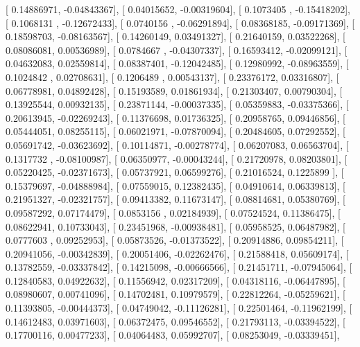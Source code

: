 \documentclass{article}
\begin{document}
       [ 0.14886971, -0.04843367],
       [ 0.04015652, -0.00319604],
       [ 0.1073405 , -0.15418202],
       [ 0.1068131 , -0.12672433],
       [ 0.0740156 , -0.06291894],
       [ 0.08368185, -0.09171369],
       [ 0.18598703, -0.08163567],
       [ 0.14260149,  0.03491327],
       [ 0.21640159,  0.03522268],
       [ 0.08086081,  0.00536989],
       [ 0.0784667 , -0.04307337],
       [ 0.16593412, -0.02099121],
       [ 0.04632083,  0.02559814],
       [ 0.08387401, -0.12042485],
       [ 0.12980992, -0.08963559],
       [ 0.1024842 ,  0.02708631],
       [ 0.1206489 ,  0.00543137],
       [ 0.23376172,  0.03316807],
       [ 0.06778981,  0.04892428],
       [ 0.15193589,  0.01861934],
       [ 0.21303407,  0.00790304],
       [ 0.13925544,  0.00932135],
       [ 0.23871144, -0.00037335],
       [ 0.05359883, -0.03375366],
       [ 0.20613945, -0.02269243],
       [ 0.11376698,  0.01736325],
       [ 0.20958765,  0.09446856],
       [ 0.05444051,  0.08255115],
       [ 0.06021971, -0.07870094],
       [ 0.20484605,  0.07292552],
       [ 0.05691742, -0.03623692],
       [ 0.10114871, -0.00278774],
       [ 0.06207083,  0.06563704],
       [ 0.1317732 , -0.08100987],
       [ 0.06350977, -0.00043244],
       [ 0.21720978,  0.08203801],
       [ 0.05220425, -0.02371673],
       [ 0.05737921,  0.06599276],
       [ 0.21016524,  0.1225899 ],
       [ 0.15379697, -0.04888984],
       [ 0.07559015,  0.12382435],
       [ 0.04910614,  0.06339813],
       [ 0.21951327, -0.02321757],
       [ 0.09413382,  0.11673147],
       [ 0.08814681,  0.05380769],
       [ 0.09587292,  0.07174479],
       [ 0.0853156 ,  0.02184939],
       [ 0.07524524,  0.11386475],
       [ 0.08622941,  0.10733043],
       [ 0.23451968, -0.00938481],
       [ 0.05958525,  0.06487982],
       [ 0.0777603 ,  0.09252953],
       [ 0.05873526, -0.01373522],
       [ 0.20914886,  0.09854211],
       [ 0.20941056, -0.00342839],
       [ 0.20051406, -0.02262476],
       [ 0.21588418,  0.05609174],
       [ 0.13782559, -0.03337842],
       [ 0.14215098, -0.00666566],
       [ 0.21451711, -0.07945064],
       [ 0.12840583,  0.04922632],
       [ 0.11556942,  0.02317209],
       [ 0.04318116, -0.06447895],
       [ 0.08980607,  0.00741096],
       [ 0.14702481,  0.10979579],
       [ 0.22812264, -0.05259621],
       [ 0.11393805, -0.00444373],
       [ 0.04749042, -0.11126281],
       [ 0.22501464, -0.11962199],
       [ 0.14612483,  0.03971603],
       [ 0.06372475,  0.09546552],
       [ 0.21793113, -0.03394522],
       [ 0.17700116,  0.00477233],
       [ 0.04064483,  0.05992707],
       [ 0.08253049, -0.03339451],
\end{document}
